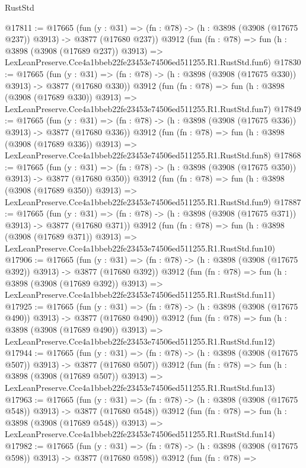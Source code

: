 \begin{lexlean}{RustStd}
\begin{coremodule}
@17811 := @17665
    (fun (y : @31) => (fn : @78) -> (h : @3898 (@3908 (@17675 @237)) @3913) -> @3877 (@17680 @237))
    @3912
    (fun (fn : @78) =>
    fun (h : @3898 (@3908 (@17689 @237)) @3913) =>
    LexLeanPreserve.Cce4a1bbeb22fe23453e74506ed511255.R1.RustStd.fun6)
@17830 := @17665
    (fun (y : @31) => (fn : @78) -> (h : @3898 (@3908 (@17675 @330)) @3913) -> @3877 (@17680 @330))
    @3912
    (fun (fn : @78) =>
    fun (h : @3898 (@3908 (@17689 @330)) @3913) =>
    LexLeanPreserve.Cce4a1bbeb22fe23453e74506ed511255.R1.RustStd.fun7)
@17849 := @17665
    (fun (y : @31) => (fn : @78) -> (h : @3898 (@3908 (@17675 @336)) @3913) -> @3877 (@17680 @336))
    @3912
    (fun (fn : @78) =>
    fun (h : @3898 (@3908 (@17689 @336)) @3913) =>
    LexLeanPreserve.Cce4a1bbeb22fe23453e74506ed511255.R1.RustStd.fun8)
@17868 := @17665
    (fun (y : @31) => (fn : @78) -> (h : @3898 (@3908 (@17675 @350)) @3913) -> @3877 (@17680 @350))
    @3912
    (fun (fn : @78) =>
    fun (h : @3898 (@3908 (@17689 @350)) @3913) =>
    LexLeanPreserve.Cce4a1bbeb22fe23453e74506ed511255.R1.RustStd.fun9)
@17887 := @17665
    (fun (y : @31) => (fn : @78) -> (h : @3898 (@3908 (@17675 @371)) @3913) -> @3877 (@17680 @371))
    @3912
    (fun (fn : @78) =>
    fun (h : @3898 (@3908 (@17689 @371)) @3913) =>
    LexLeanPreserve.Cce4a1bbeb22fe23453e74506ed511255.R1.RustStd.fun10)
@17906 := @17665
    (fun (y : @31) => (fn : @78) -> (h : @3898 (@3908 (@17675 @392)) @3913) -> @3877 (@17680 @392))
    @3912
    (fun (fn : @78) =>
    fun (h : @3898 (@3908 (@17689 @392)) @3913) =>
    LexLeanPreserve.Cce4a1bbeb22fe23453e74506ed511255.R1.RustStd.fun11)
@17925 := @17665
    (fun (y : @31) => (fn : @78) -> (h : @3898 (@3908 (@17675 @490)) @3913) -> @3877 (@17680 @490))
    @3912
    (fun (fn : @78) =>
    fun (h : @3898 (@3908 (@17689 @490)) @3913) =>
    LexLeanPreserve.Cce4a1bbeb22fe23453e74506ed511255.R1.RustStd.fun12)
@17944 := @17665
    (fun (y : @31) => (fn : @78) -> (h : @3898 (@3908 (@17675 @507)) @3913) -> @3877 (@17680 @507))
    @3912
    (fun (fn : @78) =>
    fun (h : @3898 (@3908 (@17689 @507)) @3913) =>
    LexLeanPreserve.Cce4a1bbeb22fe23453e74506ed511255.R1.RustStd.fun13)
@17963 := @17665
    (fun (y : @31) => (fn : @78) -> (h : @3898 (@3908 (@17675 @548)) @3913) -> @3877 (@17680 @548))
    @3912
    (fun (fn : @78) =>
    fun (h : @3898 (@3908 (@17689 @548)) @3913) =>
    LexLeanPreserve.Cce4a1bbeb22fe23453e74506ed511255.R1.RustStd.fun14)
@17982 := @17665
    (fun (y : @31) => (fn : @78) -> (h : @3898 (@3908 (@17675 @598)) @3913) -> @3877 (@17680 @598))
    @3912
    (fun (fn : @78) =>

\end{coremodule}
\end{lexlean}
